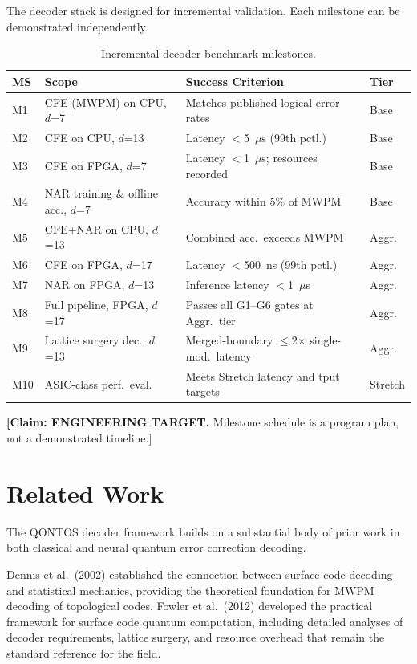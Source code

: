 \documentclass[conference]{IEEEtran}
\begin{document}
The decoder stack is designed for incremental validation. Each milestone can be demonstrated independently.

\begin{table}[H]
\centering
\caption{Incremental decoder benchmark milestones.}
\label{tab:milestones}
\footnotesize
\begin{tabularx}{\columnwidth}{lL{1.5cm}L{2.5cm}l}
\toprule
\textbf{MS} & \textbf{Scope} & \textbf{Success Criterion} & \textbf{Tier} \\
\midrule
M1 & CFE (MWPM) on CPU, $d$=7 & Matches published logical error rates & Base \\
M2 & CFE on CPU, $d$=13 & Latency $<$5~$\mu$s (99th pctl.) & Base \\
M3 & CFE on FPGA, $d$=7 & Latency $<$1~$\mu$s; resources recorded & Base \\
M4 & NAR training \& offline acc., $d$=7 & Accuracy within 5\% of MWPM & Base \\
M5 & CFE+NAR on CPU, $d$=13 & Combined acc.\ exceeds MWPM & Aggr. \\
M6 & CFE on FPGA, $d$=17 & Latency $<$500~ns (99th pctl.) & Aggr. \\
M7 & NAR on FPGA, $d$=13 & Inference latency $<$1~$\mu$s & Aggr. \\
M8 & Full pipeline, FPGA, $d$=17 & Passes all G1--G6 gates at Aggr.\ tier & Aggr. \\
M9 & Lattice surgery dec., $d$=13 & Merged-boundary $\leq$2$\times$ single-mod.\ latency & Aggr. \\
M10 & ASIC-class perf.\ eval. & Meets Stretch latency and tput targets & Stretch \\
\bottomrule
\end{tabularx}
\end{table}

\textbf{[Claim: ENGINEERING TARGET.} Milestone schedule is a program plan, not a demonstrated timeline.]

\section{Related Work}

The QONTOS decoder framework builds on a substantial body of prior work in both classical and neural quantum error correction decoding.

Dennis et al.\ (2002) established the connection between surface code decoding and statistical mechanics, providing the theoretical foundation for MWPM decoding of topological codes. Fowler et al.\ (2012) developed the practical framework for surface code quantum computation, including detailed analyses of decoder requirements, lattice surgery, and resource overhead that remain the standard reference for the field.
\end{document}
